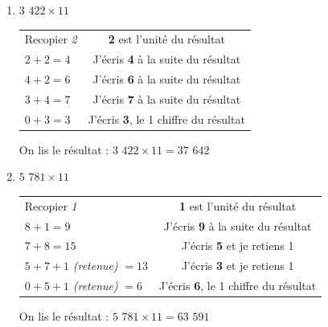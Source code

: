 \documentclass[a4paper, twoside]{article}
\begin{document}
		\begin{small}
		\begin{enumerate}

			\item $3$ $422 \times 11$
			
			\begin{tabular}{l|c}

				Recopier \textit{2} & \textbf{2} est l'unité du résultat
				
				\tabularnewline
				
				$2 + 2 = 4$ & J'écris \textbf{4} à la suite du résultat
				
				\tabularnewline
				
				$4 + 2 = 6$ & J'écris \textbf{6} à la suite du résultat
				
				\tabularnewline
				
				$3 + 4 = 7$ & J'écris \textbf{7} à la suite du résultat
				
				\tabularnewline
				
				$0 + 3 = 3$ & J'écris \textbf{3}, le 1\up{er} chiffre du résultat

			\end{tabular}	
			
			On lis le résultat : {\boldmath $3$ $422 \times 11 = 37$ $642$}\\	
			
			
			
			
			
			\item $5$ $781 \times 11$
			
			\begin{tabular}{l|c}

				Recopier \textit{1} & \textbf{1} est l'unité du résultat
				
				\tabularnewline
				
				$8 + 1 = 9$ & J'écris \textbf{9} à la suite du résultat
				
				\tabularnewline
				
				$7 + 8 = 15$ & J'écris \textbf{5} et je retiens 1
				
				\tabularnewline
				
				$5 + 7 + 1$ \textit{(retenue)} $= 13$ & J'écris \textbf{3} et je retiens 1
				
				\tabularnewline
				
				$0 + 5 + 1$ \textit{(retenue)} $= 6$ & J'écris \textbf{6}, le 1\up{er} chiffre du résultat
				
			\end{tabular}
			
			On lis le résultat : {\boldmath $5$ $781 \times 11 = 63$ $591$}\\

		\end{enumerate}
		\end{small}
\end{document}
